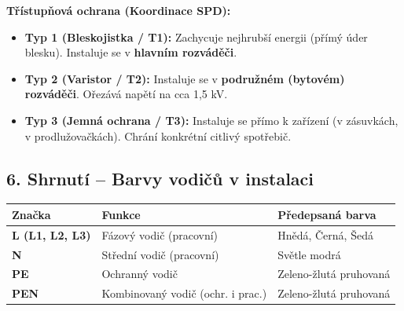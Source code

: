 \documentclass[a4paper,10pt]{article}
\begin{document}
\begin{vysvetlenibox}
\textbf{Třístupňová ochrana (Koordinace SPD):}
\begin{itemize}
    \item \textbf{Typ 1 (Bleskojistka / T1):} Zachycuje nejhrubší energii (přímý úder blesku). Instaluje se v \textbf{hlavním rozváděči}.
    \item \textbf{Typ 2 (Varistor / T2):} Instaluje se v \textbf{podružném (bytovém) rozváděči}. Ořezává napětí na cca 1,5 kV.
    \item \textbf{Typ 3 (Jemná ochrana / T3):} Instaluje se přímo k zařízení (v zásuvkách, v prodlužovačkách). Chrání konkrétní citlivý spotřebič.
\end{itemize}

\subsection*{6. Shrnutí – Barvy vodičů v instalaci}

\begin{center}
\begin{tabularx}{0.97\linewidth}{@{} l l X @{}}
\toprule
\textbf{Značka} & \textbf{Funkce} & \textbf{Předepsaná barva} \\
\midrule
\textbf{L (L1, L2, L3)} & Fázový vodič (pracovní) & Hnědá, Černá, Šedá \\
\textbf{N} & Střední vodič (pracovní) & Světle modrá \\
\textbf{PE} & Ochranný vodič & Zeleno-žlutá pruhovaná \\
\textbf{PEN} & Kombinovaný vodič (ochr. i prac.) & Zeleno-žlutá pruhovaná \\
\bottomrule
\end{tabularx}
\end{center}

\end{vysvetlenibox}
\end{document}
